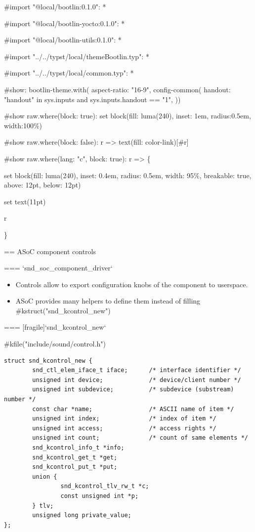 #import "@local/bootlin:0.1.0": * 

#import "@local/bootlin-yocto:0.1.0": *

#import "@local/bootlin-utils:0.1.0": *

#import "../../typst/local/themeBootlin.typ": *

#import "../../typst/local/common.typ": *

#show: bootlin-theme.with(
  aspect-ratio: "16-9",
config-common(
  handout: "handout" in sys.inputs and sys.inputs.handout == "1",
))

#show raw.where(block: true): set block(fill: luma(240), inset: 1em, radius:0.5em, width:100\%) 

#show raw.where(block: false): r => { text(fill: color-link)[#r] } 

#show raw.where(lang: "c", block: true): r => \{

set block(fill: luma(240),
inset: 0.4em,
radius: 0.5em,
width: 95\%, breakable: true, above: 12pt, below: 12pt)

set text(11pt)

r

\} 

== ASoC component controls

=== {`snd_soc_component_driver`}
  \begin{itemize}
  \item Controls allow to export configuration knobs of the component
    to userspace.
  \item ASoC provides many helpers to define them instead of filling
    #kstruct("snd_kcontrol_new")
  \end{itemize}


=== [fragile]{`snd_kcontrol_new`}
  \begin{block}{#kfile("include/sound/control.h")}
    \fontsize{9}{9}\selectfont
    \begin{verbatim}
struct snd_kcontrol_new {
        snd_ctl_elem_iface_t iface;      /* interface identifier */
        unsigned int device;             /* device/client number */
        unsigned int subdevice;          /* subdevice (substream) number */
        const char *name;                /* ASCII name of item */
        unsigned int index;              /* index of item */
        unsigned int access;             /* access rights */
        unsigned int count;              /* count of same elements */
        snd_kcontrol_info_t *info;
        snd_kcontrol_get_t *get;
        snd_kcontrol_put_t *put;
        union {
                snd_kcontrol_tlv_rw_t *c;
                const unsigned int *p;
        } tlv;
        unsigned long private_value;
};
    \end{verbatim}
  \end{block}


